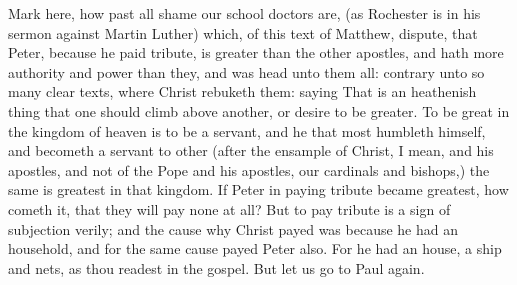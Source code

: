 Mark here, how past all shame our school doctors are, 
(as Rochester is in his sermon against Martin Luther) 
which, of this text of Matthew, dispute, that Peter, because
he paid tribute, is greater than the other apostles, and hath
more authority and power than they, and was head unto 
them all: contrary unto so many clear texts, where Christ 
rebuketh them: saying That is an heathenish thing that one 
should climb above another, or desire to be greater. To be 
great in the kingdom of heaven is to be a servant, and he 
that most humbleth himself, and becometh a servant to 
other (after the ensample of Christ, I mean, and his apostles, 
and not of the Pope and his apostles, our cardinals and 
bishops,) the same is greatest in that kingdom. If Peter 
in paying tribute became greatest, how cometh it, that they 
will pay none at all? But to pay tribute is a sign of subjection
verily; and the cause why Christ payed was because 
he had an household, and for the same cause payed Peter 
also. For he had an house, a ship and nets, as thou readest 
in the gospel. But let us go to Paul again. 


